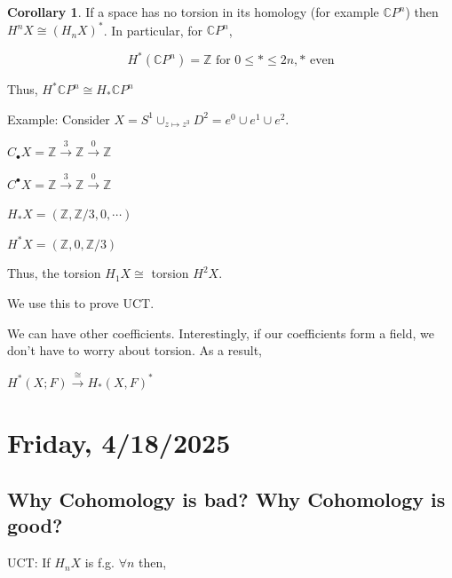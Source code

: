 \documentclass{article}
\theoremstyle{definition}
\newtheorem{corollary}[theorem]{Corollary}
\begin{document}
    \begin{corollary}
        If a space has no torsion in its homology (for example \(\mathbb{C} P^n\)) then \(H^n X \cong (H_n X)^{\ast}\). In particular, for \(\mathbb{C} P^n\),

        \[
            H^{\ast} (\mathbb{C} P^n) = \mathbb{Z} \text{ for } 0 \leq \ast \leq 2n, \ast \text{ even}
        \]

        Thus, \(H^{\ast} \mathbb{C} P^n \cong H_{\ast} \mathbb{C} P^n\)
    \end{corollary}

    Example: Consider \(X = S^1 \cup_{z \mapsto z^3} D^2 = e^0 \cup e^1 \cup e^2\).
    
    \begin{center}
    \end{center}

    \(C_\bullet X = \mathbb{Z} \xrightarrow{3} \mathbb{Z} \xrightarrow{0} \mathbb{Z}\)

    \(C^\bullet X = \mathbb{Z} \xrightarrow{3} \mathbb{Z} \xrightarrow{0} \mathbb{Z}\) 

    \(H_{\ast} X = (\mathbb{Z}, \mathbb{Z} / 3, 0, \cdots)\)
    
    \(H^{\ast} X = (\mathbb{Z}, 0, \mathbb{Z} / 3)\)

    Thus, the torsion \(H_1 X \cong\) torsion \(H^2 X\).
    
    We use this to prove UCT.

    We can have other coefficients. Interestingly, if our coefficients form a field, we don't have to worry about torsion. As a result,

    \(H^{\ast}(X;F) \xrightarrow{\cong} H_{\ast} (X,F)^{\ast}\)
    
    \section*{Friday, 4/18/2025}
    
    \subsection*{Why Cohomology is bad? Why Cohomology is good?}

    UCT: If \(H_n X\) is f.g. \(\forall n\) then,
\end{document}
